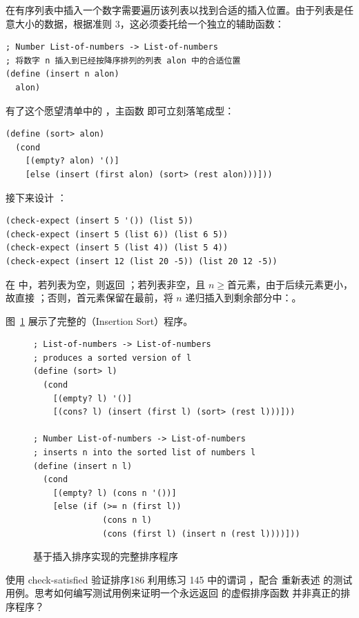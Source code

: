 在有序列表中插入一个数字需要遍历该列表以找到合适的插入位置。由于列表是任意大小的数据，根据准则 3，这必须委托给一个独立的辅助函数：
\begin{lstlisting}[language=BSL]
; Number List-of-numbers -> List-of-numbers
; 将数字 n 插入到已经按降序排列的列表 alon 中的合适位置
(define (insert n alon)
  alon)
\end{lstlisting}

有了这个愿望清单中的 ，主函数  即可立刻落笔成型：
\begin{lstlisting}[language=BSL]
(define (sort> alon)
  (cond
    [(empty? alon) '()]
    [else (insert (first alon) (sort> (rest alon)))]))
\end{lstlisting}

接下来设计 ：
\begin{lstlisting}[language=BSL]
(check-expect (insert 5 '()) (list 5))
(check-expect (insert 5 (list 6)) (list 6 5))
(check-expect (insert 5 (list 4)) (list 5 4))
(check-expect (insert 12 (list 20 -5)) (list 20 12 -5))
\end{lstlisting}

在  中，若列表为空，则返回 ；若列表非空，且 $n \ge \text{首元素}$，由于后续元素更小，故直接 ；否则，首元素保留在最前，将 $n$ 递归插入到剩余部分中：。

图~\ref{fig:sorting_lists_of_numbers} 展示了完整的（Insertion Sort）程序。

\begin{figure}[htbp]
  \centering
\begin{lstlisting}[language=BSL, basicstyle=\scriptsize\ttfamily]
; List-of-numbers -> List-of-numbers
; produces a sorted version of l
(define (sort> l)
  (cond
    [(empty? l) '()]
    [(cons? l) (insert (first l) (sort> (rest l)))]))

; Number List-of-numbers -> List-of-numbers
; inserts n into the sorted list of numbers l
(define (insert n l)
  (cond
    [(empty? l) (cons n '())]
    [else (if (>= n (first l))
              (cons n l)
              (cons (first l) (insert n (rest l))))]))
\end{lstlisting}
  \caption{基于插入排序实现的完整排序程序}
  \label{fig:sorting_lists_of_numbers}
\end{figure}

\begin{exercise}{使用 check-satisfied 验证排序}{186}
利用练习 145 中的谓词 ，配合  重新表述  的测试用例。思考如何编写测试用例来证明一个永远返回  的虚假排序函数  并非真正的排序程序？
\end{exercise}

